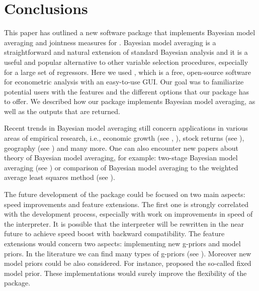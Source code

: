 \section{Conclusions}\label{Conclusions}
This paper has outlined a new software package that implements
Bayesian model averaging and jointness measures for . Bayesian
model averaging is a straightforward and natural extension of standard
Bayesian analysis and it is a useful and popular alternative to other
variable selection procedures, especially for a large set of
regressors. Here we used , which is a free, open-source
software for econometric analysis with an easy-to-use GUI. Our goal
was to familiarize potential users with the features and the different
options that our package has to offer. We described how our package
implements Bayesian model averaging, as well as the outputs that are
returned.

Recent trends in Bayesian model averaging still concern applications
in various areas of empirical research, i.e., economic growth (see
\citealt{RePEc:taf:regstd:v:48:y:2014:i:1:p:44-67},
\citealt{GazdaPuziak2012}), stock returns (see
\citealt{RePEc:cqe:wpaper:2914}), geography (see
\citealt{RePEc:eee:csdana:v:75:y:2014:i:c:p:227-238}) and many more.
One can also encounter new papers about theory of Bayesian model
averaging, for example: two-stage Bayesian model averaging (see
\citealt{RePEc:taf:emetrv:v:33:y:2014:i:1-4:p:122-151}) or comparison
of Bayesian model averaging to the weighted average least squares
method (see \citealt{RePEc:dgr:kubcen:2011082}).

The future development of the  package could be focused on two
main aspects: speed improvements and feature extensions. The first one
is strongly correlated with the  development process, especially
with work on improvements in speed of the  interpreter. It is
possible that the interpreter will be rewritten in the near future to
achieve speed boost with backward compatibility.  The feature
extensions would concern two aspects: implementing new g-priors and
model priors.  In the literature we can find many types of g-priors
(see \citealt{FernandezLeySteel2001a}).  Moreover new model priors
could be also considered.  For instance,
\cite{RePEc:aea:aecrev:v:94:y:2004:i:4:p:813-835} proposed the
so-called fixed model prior.  These implementations would surely
improve the flexibility of the  package.
 
